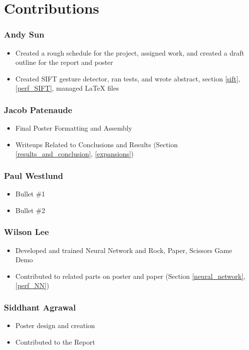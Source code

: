 \section{Contributions}

\subsubsection*{Andy Sun}
\begin{itemize}
\item Created a rough schedule for the project, assigned work, and created a draft outline for the report and poster
\item Created SIFT gesture detector, ran tests, and wrote abstract, section \ref{sift}, \ref{perf_SIFT}, managed \LaTeX{} files
\end{itemize}

\subsubsection*{Jacob Patenaude}
\begin{itemize}
\item Final Poster Formatting and Assembly
\item Writeups Related to Conclusions and Results (Section \ref{results_and_conclusion}, \ref{expansions})
\end{itemize}

\subsubsection*{Paul Westlund}
\begin{itemize}
\item Bullet \#1
\item Bullet \#2
\end{itemize}

\subsubsection*{Wilson Lee}
\begin{itemize}
\item Developed and trained Neural Network and Rock, Paper, Scissors Game Demo
\item Contributed to related parts on poster and paper (Section \ref{neural_network}, \ref{perf_NN})
\end{itemize}

\subsubsection*{Siddhant Agrawal}
\begin{itemize}
\item Poster design and creation
\item Contributed to the Report
\end{itemize}
